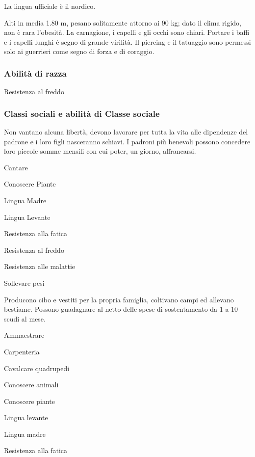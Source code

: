 La lingua ufficiale \`e il nordico. 

\Fisico Alti in media 1.80 m, pesano solitamente attorno ai 90 kg; dato il clima
rigido, non \`e rara l'obesit\`a. La carnagione, i capelli e gli
occhi sono chiari. Portare i baffi e i capelli lunghi \`e segno di
grande virilit\`a. Il piercing e il tatuaggio sono permessi solo ai
guerrieri come segno di forza e di coraggio.  

\minmaxumani

\subsubsection{Abilit\`a di razza}

\begin{abilist}
\item Resistenza al freddo
\end{abilist}

\subsubsection{Classi sociali e abilit\`a di Classe sociale}


Non vantano alcuna libert\`a, devono lavorare per tutta la vita alle
dipendenze del padrone e i loro figli nasceranno schiavi. I padroni
pi\`u benevoli possono concedere loro piccole somme mensili
con cui poter, un giorno, affrancarsi.

\begin{abilist}
\item Cantare
\item Conoscere Piante
\item Lingua Madre
\item Lingua Levante
\item Resistenza alla fatica
\item Resistenza al freddo
\item Resistenza alle malattie
\item Sollevare pesi
\end{abilist}


Producono cibo e vestiti per la propria famiglia, coltivano campi ed
allevano bestiame. Possono guadagnare al netto delle spese di
sostentamento da 1 a 10 scudi al mese.

\begin{abilist}
\item Ammaestrare
\item Carpenteria
\item Cavalcare quadrupedi
\item Conoscere animali
\item Conoscere piante
\item Lingua levante
\item Lingua madre
\item Resistenza alla fatica
\end{abilist}

